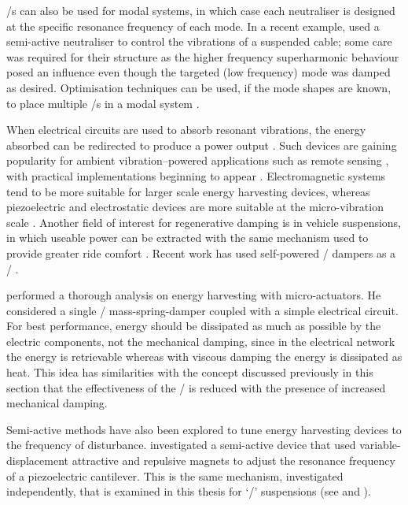 \documentclass[11pt,a4paper]{memoir}
\begin{document}
\Vibneut/s can also be used for modal systems, in which case each neutraliser is designed at the specific resonance frequency of each mode.
In a recent example, \textcite{casciati2007} used a semi-active neutraliser to control the vibrations of a suspended cable; some care was required for their structure as the higher frequency superharmonic behaviour posed an influence even though the targeted (low frequency) mode was damped as desired.
Optimisation techniques can be used, if the mode shapes are known, to place multiple \vibneut/s in a modal system \cite{petit2009-jva}.

When electrical circuits are used to absorb resonant vibrations, the energy absorbed can be redirected to produce a power output \cite{stephen2006}.
Such devices are gaining popularity for ambient vibration--powered applications such as remote sensing \cite{arnold2007}, with practical implementations beginning to appear \cite{ferrari2009-sms}.
Electromagnetic systems tend to be more suitable for larger scale energy harvesting devices, whereas piezoelectric and electrostatic devices are more suitable at the micro-vibration scale \cite{beeby2009}.
Another field of interest for regenerative damping is in vehicle suspensions, in which useable power can be extracted with the same mechanism used to provide greater ride comfort \cite{graves2000thesis}.
Recent work has used self-powered \magnetorh/ dampers as a \vibneut/ \cite{choi2009-jva}.

\textcite{stephen2006} performed a thorough analysis on energy harvesting with micro-actuators.
He considered a single \dof/ mass-spring-damper coupled with a simple electrical circuit.
For best performance, energy should be dissipated as much as possible by the electric components, not the mechanical damping, since in the electrical network the energy is retrievable whereas with viscous damping the energy is dissipated as heat.
This idea has similarities with the concept discussed previously in this section that the effectiveness of the \vibneut/ is reduced with the presence of increased mechanical damping.

Semi-active methods have also been explored to tune energy harvesting devices to the frequency of disturbance.
\textcite{challa2008} investigated a semi-active device that used variable-displacement attractive and repulsive magnets to adjust the resonance frequency of a piezoelectric cantilever.
This is the same mechanism, investigated independently, that is examined in this thesis for `\qzs/' suspensions (see  and ).
\end{document}
